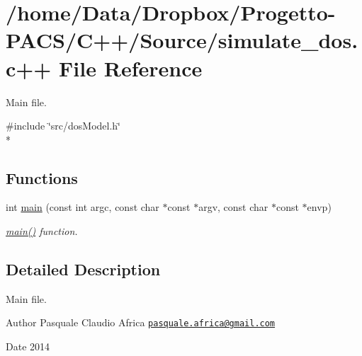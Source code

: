 \hypertarget{simulate__dos_8c_09_09}{\section{/home/\-Data/\-Dropbox/\-Progetto-\/\-P\-A\-C\-S/\-C++/\-Source/simulate\-\_\-dos.c++ File Reference}
\label{simulate__dos_8c_09_09}
}


Main file.  


{\ttfamily \#include \char`\"{}src/dos\-Model.\-h\char`\"{}}\\*
\subsection*{Functions}
\begin{DoxyCompactItemize}
\item 
\hypertarget{simulate__dos_8c_09_09_abb42499d73e7c21855b75ac125b8da84}{int \hyperlink{simulate__dos_8c_09_09_abb42499d73e7c21855b75ac125b8da84}{main} (const int argc, const char $\ast$const $\ast$argv, const char $\ast$const $\ast$envp)}\label{simulate__dos_8c_09_09_abb42499d73e7c21855b75ac125b8da84}

\begin{DoxyCompactList}\small\item\em \hyperlink{simulate__dos_8c_09_09_abb42499d73e7c21855b75ac125b8da84}{main()} function. \end{DoxyCompactList}\end{DoxyCompactItemize}


\subsection{Detailed Description}
Main file. \begin{DoxyAuthor}{Author}
Pasquale Claudio Africa \href{mailto:pasquale.africa@gmail.com}{\tt pasquale.\-africa@gmail.\-com} 
\end{DoxyAuthor}
\begin{DoxyDate}{Date}
2014 
\end{DoxyDate}
